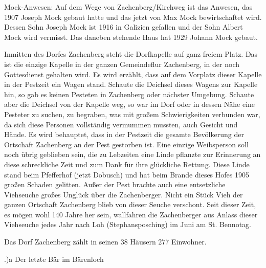 \documentclass{book}
\begin{document}
Mock-Anwesen: Auf dem Wege von Zachenberg/Kirchweg ist das Anwesen, das 1907
Joseph Mock gebaut hatte und das jetzt von Max Mock bewirtschaftet wird. Dessen
Sohn Joseph Mock ist 1916 in Galizien gefallen und der Sohn Albert Mock wird
vermisst. Das daneben stehende Haus hat 1929 Johann Mock gebaut.

Inmitten des Dorfes Zachenberg steht die Dorfkapelle auf ganz freiem Platz. Das
ist die einzige Kapelle in der ganzen Gemeindeflur Zachenberg, in der noch
Gottesdienst gehalten wird. Es wird erzählt, dass auf dem Vorplatz dieser
Kapelle in der Pestzeit ein Wagen stand. Schaute die Deichsel dieses Wagens zur
Kapelle hin, so gab es keinen Pesteten in Zachenberg oder nächster Umgebung.
Schaute aber die Deichsel von der Kapelle weg, so war im Dorf oder in dessen
Nähe eine Pesteter zu suchen, zu begraben, was mit großem Schwierigkeiten
verbunden war, da sich diese Personen vollständig vermummen mussten, auch
Gesicht und Hände. Es wird behauptet, dass in der Pestzeit die gesamte
Bevölkerung der Ortschaft Zachenberg an der Pest gestorben ist. Eine einzige
Weibsperson soll noch übrig geblieben sein, die zu Lebzeiten eine Linde pflanzte
zur Erinnerung an diese schreckliche Zeit und zum Dank für ihre glückliche
Rettung. Diese Linde stand beim Pfefferhof (jetzt Dobusch) und hat beim Brande
dieses Hofes 1905 großen Schaden gelitten. Außer der Pest brachte auch eine
entsetzliche Viehseuche großes Unglück über die Zachenberger. Nicht ein Stück
Vieh der ganzen Ortschaft Zachenberg blieb von dieser Seuche verschont. Seit
dieser Zeit, es mögen wohl 140 Jahre her sein, wallfahren die Zachenberger aus
Anlass dieser Viehseuche jedes Jahr nach Loh (Stephansposching) im Juni am St.
Bennotag.

Das Dorf Zachenberg zählt in seinen 38 Häusern 277 Einwohner.

.)a Der letzte Bär im Bärenloch
\end{document}
